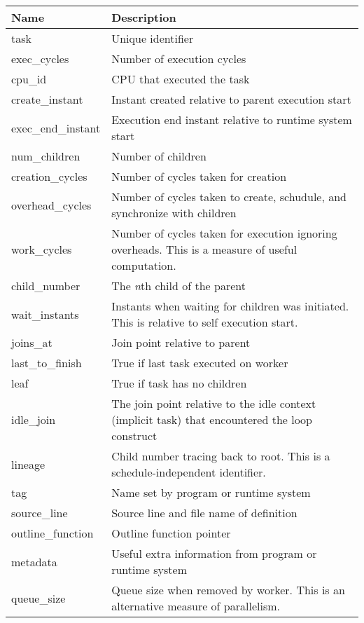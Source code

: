 \documentclass[11pt,a4paper]{article}
\begin{document}
\begin{appendices}
    \begin{longtable}{|p{4cm}|p{7cm}|}
    \hline
    \textbf{Name} & \textbf{Description} \\ \hline
    task & Unique identifier \\ \hline
    exec\_cycles & Number of execution cycles \\ \hline
    cpu\_id & CPU that executed the task \\ \hline
    create\_instant & Instant created relative to parent execution start \\ \hline
    exec\_end\_instant & Execution end instant relative to runtime system start \\ \hline
    num\_children & Number of children \\ \hline
    creation\_cycles & Number of cycles taken for creation \\ \hline
    overhead\_cycles & Number of cycles taken to create, schudule, and synchronize with children \\ \hline
    work\_cycles & Number of cycles taken for execution ignoring overheads. This is a measure of useful computation. \\ \hline
    child\_number & The \textit{n}th child of the parent \\ \hline
    wait\_instants & Instants when waiting for children was initiated. This is relative to self execution start. \\ \hline
    joins\_at & Join point relative to parent \\ \hline
    last\_to\_finish & True if last task executed on worker \\ \hline
    leaf & True if task has no children \\ \hline
    idle\_join & The join point relative to the idle context (implicit task) that encountered the loop construct \\ \hline
    lineage & Child number tracing back to root. This is a schedule-independent identifier.\\ \hline
    tag & Name set by program or runtime system \\ \hline
    source\_line & Source line and file name of definition \\ \hline
    outline\_function & Outline function pointer \\ \hline
    metadata & Useful extra information from program or runtime system \\ \hline
    queue\_size & Queue size when removed by worker. This is an alternative measure of parallelism. \\ \hline

\end{longtable}
\end{appendices}
\end{document}
